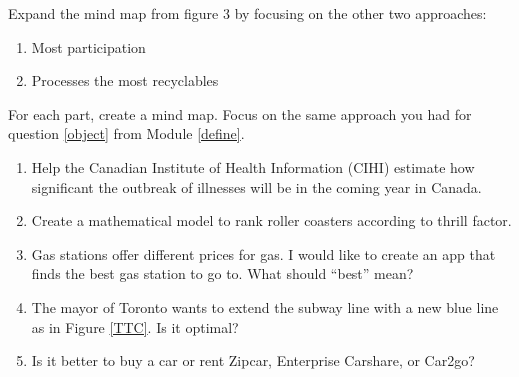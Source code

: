 \begin{exercises}
	\begin{problist}
		\prob
		Expand the mind map from figure 3 by focusing on the other two approaches:
		\begin{enumerate}
			\item Most participation
			\item Processes the most recyclables
		\end{enumerate}

		\prob
	For each part, create a mind map. Focus on the same approach you had for question \ref{object} from Module \ref{define}.
		\begin{enumerate}
			\item Help the Canadian Institute of Health Information (CIHI) estimate how significant the outbreak of illnesses will be in the coming year in Canada.
			\item Create a mathematical model to rank roller coasters according to thrill factor.
			\item Gas stations offer different prices for gas. I would like to create an app that finds the best gas station to go to. What should ``best'' mean?
			\item The mayor of Toronto wants to extend the subway line with a new blue line as in Figure \ref{TTC}. Is it optimal?
			
			\item Is it better to buy a car or rent Zipcar, Enterprise Carshare, or Car2go?
		
	\end{enumerate}
	\end{problist}
\end{exercises}
